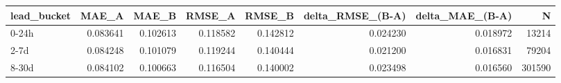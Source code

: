 \begin{tabular}{lrrrrrrr}
\toprule
lead_bucket & MAE_A & MAE_B & RMSE_A & RMSE_B & delta_RMSE_(B-A) & delta_MAE_(B-A) & N \\
\midrule
0-24h & 0.083641 & 0.102613 & 0.118582 & 0.142812 & 0.024230 & 0.018972 & 13214 \\
2-7d & 0.084248 & 0.101079 & 0.119244 & 0.140444 & 0.021200 & 0.016831 & 79204 \\
8-30d & 0.084102 & 0.100663 & 0.116504 & 0.140002 & 0.023498 & 0.016560 & 301590 \\
\bottomrule
\end{tabular}
